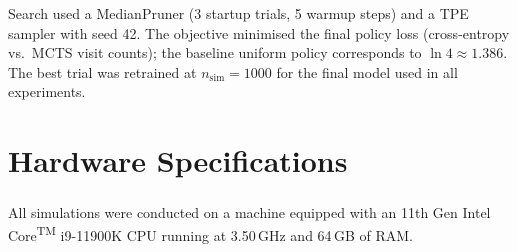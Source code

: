 \documentclass[acmlarge, manuscript, screen, review, natbib=false, oneside]{acmart}
\begin{document}
Search used a MedianPruner (3 startup trials, 5 warmup steps) and a TPE sampler with seed 42. The objective minimised the final policy loss (cross-entropy vs.\ MCTS visit counts); the baseline uniform policy corresponds to $\ln 4 \approx 1.386$. The best trial was retrained at $n_\text{sim}=1000$ for the final model used in all experiments.

\section{Hardware Specifications}\label{sec:hardware}
All simulations were conducted on a machine equipped with an 11th Gen Intel\textsuperscript{\textregistered} Core\textsuperscript{TM} i9-11900K CPU running at 3.50\,GHz and 64\,GB of RAM.
\end{document}
